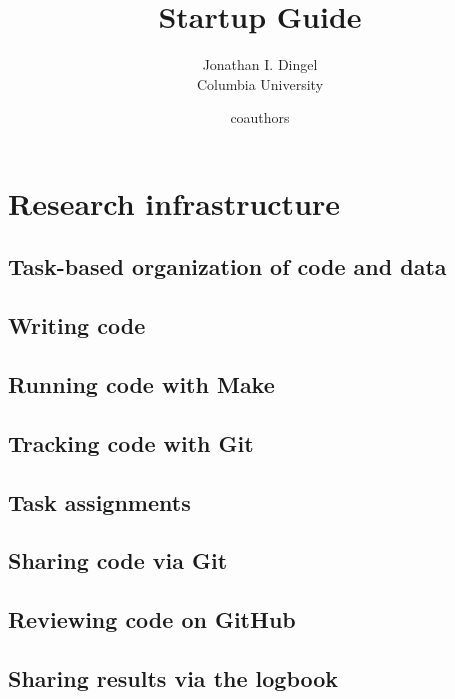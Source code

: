 \documentclass{report}
\title{Startup Guide}
\author{
Jonathan I. Dingel \\ {Columbia University} \and
coauthors
}
\date{}
\numberwithin{equation}{section}
\numberwithin{figure}{section}
\numberwithin{table}{section}
\begin{document}
\maketitle

\renewcommand{\thechapter}{\Alph{chapter}}
\setcounter{tocdepth}{1}
\tableofcontents
\etocsettocstyle{}{} %

\chapter{Research infrastructure}


\section{Task-based organization of code and data} 
\section{Writing code} 
\section{Running code with Make} 
\section{Tracking code with Git} 

\section{Task assignments} 
\section{Sharing code via Git} 
\section{Reviewing code on GitHub} 
\section{Sharing results via the logbook} 
\end{document}
